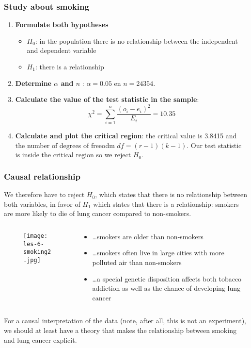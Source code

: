 \documentclass[aspectratio=169]{beamer}
\begin{document}
\begin{frame}
  \frametitle{Study about smoking}
  \begin{enumerate}
    \item \textbf{Formulate both hypotheses}
    \begin{itemize}
      \item $H_{0}$: in the population there is no relationship between the independent and dependent variable
      \item $H_{1}$: there is a relationship 
    \end{itemize}
    \item \textbf{Determine $\alpha$ and $n$} : $\alpha = 0.05$ en $n = 24354$.
    \item \textbf{Calculate the value of the test statistic in the sample}:
    \[ \chi^{2} = \sum_{i=1}^{n} \frac{(o_{i} - e_{i})^{2}}{E_{i}} = 10.35 \]
    \item \textbf{Calculate and plot the critical region}:  the critical value is 3.8415 and the number of degrees of freeodm $df = (r-1)(k-1)$. Our test statistic is inside the critical region so we reject $H_{0}$.
  \end{enumerate}
\end{frame}

\begin{frame}
  \frametitle{Causal relationship}
  We therefore have to reject $H_{0}$, which states that there is no relationship between both variables, in favor of $H_{1}$ which states that there is a relationship: smokers are more likely to die of lung cancer compared to non-smokers.
  \begin{columns}
    \begin{column}{0.3 \textwidth}
      
      \begin{figure}
        \centering
        \texttt{[image: les-6-smoking2.jpg]}
      \end{figure}
      
    \end{column}
    \begin{column}{0.7 \textwidth}
      
      \begin{itemize}
        \item  \dots smokers are older than non-smokers
        \item \dots smokers often live in large cities with more polluted air than non-smokers
        \item \dots a special genetic disposition affects both tobacco addiction as well as the chance of developing lung cancer
      \end{itemize}
    \end{column}
  \end{columns}
  For a causal interpretation of the data (note, after all, this is not an experiment), we should at least have a theory that makes the relationship between smoking and lung cancer explicit.
  
\end{frame}
\end{document}
